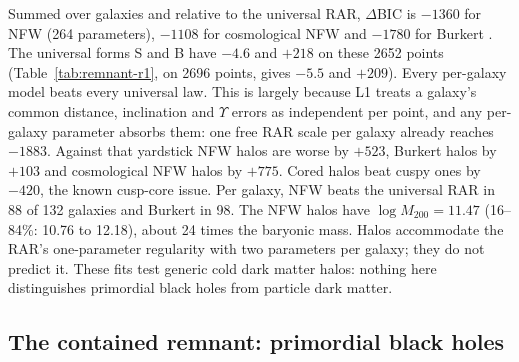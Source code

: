 Summed over galaxies and relative to the universal RAR, $\Delta$BIC is $-1360$ for NFW (264 parameters), $-1108$ for cosmological NFW and
$-1780$ for Burkert  \tagS. The universal forms S and B have $-4.6$ and $+218$ on these 2652 points (Table~\ref{tab:remnant-r1}, on 2696 points, gives $-5.5$ and $+209$). Every per-galaxy model beats every universal law. This is
largely because L1 treats a galaxy's common distance, inclination and $\Upsilon$ errors as independent per point, and any per-galaxy
parameter absorbs them: one free RAR scale per galaxy already reaches $-1883$. Against that yardstick NFW halos are worse by $+523$,
Burkert halos by $+103$ and cosmological NFW halos by $+775$. Cored halos beat cuspy ones by $-420$, the known cusp-core issue. Per galaxy,
NFW beats the universal RAR in 88 of 132 galaxies and Burkert in 98. The NFW halos have $\log M_{200}=11.47$ (16--84\%: 10.76 to 12.18),
about 24 times the baryonic mass. Halos accommodate the RAR's one-parameter regularity with two parameters per galaxy; they do not predict
it. These fits test generic cold dark matter halos: nothing here distinguishes primordial black holes from particle dark matter.

\subsection{The contained remnant: primordial black holes}\label{sec:remnant-pbh}

